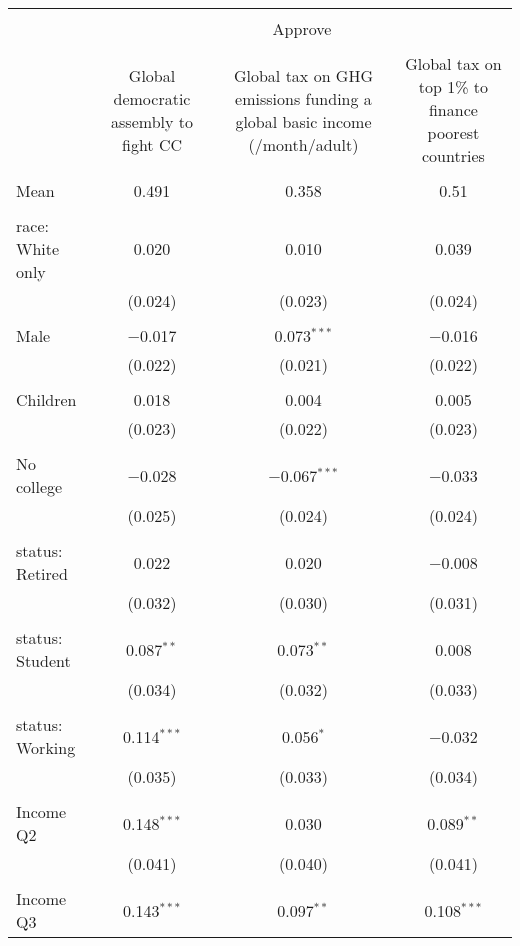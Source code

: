 
\begin{tabular}{@{\extracolsep{5pt}}lccc} 
\\[-1.8ex]\hline 
\hline \\[-1.8ex] 
 & \multicolumn{3}{c}{Approve} \\ 
\cline{2-4} 
\\[-1.8ex] & Global democratic assembly to fight CC & Global tax on GHG emissions funding a global basic income (\textdollar 30/month/adult) & Global tax on top 1\% to finance poorest countries \\ 
\hline \\[-1.8ex] 
 Mean & 0.491 & 0.358 & 0.51  \\ \hline \\[-1.8ex] race: White only & 0.020 & 0.010 & 0.039 \\ 
  & (0.024) & (0.023) & (0.024) \\ 
  & & & \\ 
 Male & $-$0.017 & 0.073$^{***}$ & $-$0.016 \\ 
  & (0.022) & (0.021) & (0.022) \\ 
  & & & \\ 
 Children & 0.018 & 0.004 & 0.005 \\ 
  & (0.023) & (0.022) & (0.023) \\ 
  & & & \\ 
 No college & $-$0.028 & $-$0.067$^{***}$ & $-$0.033 \\ 
  & (0.025) & (0.024) & (0.024) \\ 
  & & & \\ 
 status: Retired & 0.022 & 0.020 & $-$0.008 \\ 
  & (0.032) & (0.030) & (0.031) \\ 
  & & & \\ 
 status: Student & 0.087$^{**}$ & 0.073$^{**}$ & 0.008 \\ 
  & (0.034) & (0.032) & (0.033) \\ 
  & & & \\ 
 status: Working & 0.114$^{***}$ & 0.056$^{*}$ & $-$0.032 \\ 
  & (0.035) & (0.033) & (0.034) \\ 
  & & & \\ 
 Income Q2 & 0.148$^{***}$ & 0.030 & 0.089$^{**}$ \\ 
  & (0.041) & (0.040) & (0.041) \\ 
  & & & \\ 
 Income Q3 & 0.143$^{***}$ & 0.097$^{**}$ & 0.108$^{***}$ \\ 

\end{tabular}
